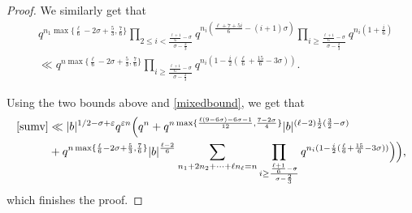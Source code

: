 \documentclass[10pt,a4paper]{amsart}
\begin{document}
\begin{proof}
We similarly get that
\begin{align*}
& q^{n_1 \max\{ \frac{\ell}{6}-2\sigma+\frac{5}{3}, \frac{7}{6} \}}  \prod_{2 \leq i< \frac{ \frac{\ell+1}{6} -\sigma}{\sigma-\frac{2}{3}}} q^{n_i ( \frac{\ell+7+5i}{6}-(i+1)\sigma)} \prod_{i \geq  \frac{ \frac{\ell+1}{6} -\sigma}{\sigma-\frac{2}{3}}} q^{n_i (1+\frac{i}{6})} \\
& \ll q^{n \max\{ \frac{\ell}{6}-2\sigma+\frac{5}{3}, \frac{7}{6} \}} \prod_{i \geq  \frac{ \frac{\ell+1}{6} -\sigma}{\sigma-\frac{2}{3}}} q^{n_i (1-\frac{i}{2} ( \frac{\ell}{6} +\frac{15}{6}-3\sigma))}.
\end{align*}

Using the two bounds above and \eqref{mixedbound}, we get that
\begin{align*}
\eqref{sumv} & \ll |b|^{1/2-\sigma+\varepsilon} q^{\varepsilon n} \Big(q^n +q^{ n \max\{ \frac{\ell(9-6\sigma)-6\sigma-1}{12} , \frac{7-2\sigma}{4} \}} |b|^{(\ell-2)\frac{1}{2} (\frac{3}{2}-\sigma)}\\
& +q^{n \max\{ \frac{\ell}{6}-2\sigma+\frac{5}{3}, \frac{7}{6} \}} |b|^{\frac{\ell-2}{6}} \sum_{n_1+2n_2+\cdots+\ell n_{\ell}=n}  \prod_{i \geq  \frac{ \frac{\ell+1}{6} -\sigma}{\sigma-\frac{2}{3}}} q^{n_i (1-\frac{i}{2} ( \frac{\ell}{6} +\frac{15}{6}-3\sigma))}  \Big) \Big),
\end{align*}
which finishes the proof.
 \end{proof}
\end{document}
